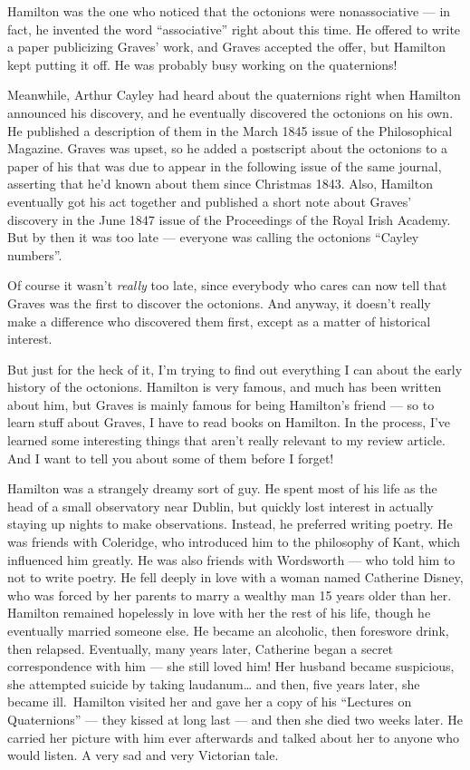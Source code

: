\documentclass{article}
\begin{document}
Hamilton was the one who noticed that the octonions were nonassociative
--- in fact, he invented the word ``associative'' right about this time.
He offered to write a paper publicizing Graves' work, and Graves
accepted the offer, but Hamilton kept putting it off. He was probably
busy working on the quaternions!

Meanwhile, Arthur Cayley had heard about the quaternions right when
Hamilton announced his discovery, and he eventually discovered the
octonions on his own. He published a description of them in the March
1845 issue of the Philosophical Magazine. Graves was upset, so he added
a postscript about the octonions to a paper of his that was due to
appear in the following issue of the same journal, asserting that he'd
known about them since Christmas 1843. Also, Hamilton eventually got his
act together and published a short note about Graves' discovery in the
June 1847 issue of the Proceedings of the Royal Irish Academy. But by
then it was too late --- everyone was calling the octonions ``Cayley
numbers''.

Of course it wasn't \emph{really} too late, since everybody who cares
can now tell that Graves was the first to discover the octonions. And
anyway, it doesn't really make a difference who discovered them first,
except as a matter of historical interest.

But just for the heck of it, I'm trying to find out everything I can
about the early history of the octonions. Hamilton is very famous, and
much has been written about him, but Graves is mainly famous for being
Hamilton's friend --- so to learn stuff about Graves, I have to read
books on Hamilton. In the process, I've learned some interesting things
that aren't really relevant to my review article. And I want to tell you
about some of them before I forget!

Hamilton was a strangely dreamy sort of guy. He spent most of his life
as the head of a small observatory near Dublin, but quickly lost
interest in actually staying up nights to make observations. Instead, he
preferred writing poetry. He was friends with Coleridge, who introduced
him to the philosophy of Kant, which influenced him greatly. He was also
friends with Wordsworth --- who told him to not to write poetry. He fell
deeply in love with a woman named Catherine Disney, who was forced by
her parents to marry a wealthy man 15 years older than her. Hamilton
remained hopelessly in love with her the rest of his life, though he
eventually married someone else. He became an alcoholic, then foreswore
drink, then relapsed. Eventually, many years later, Catherine began a
secret correspondence with him --- she still loved him! Her husband
became suspicious, she attempted suicide by taking laudanum\ldots{} and
then, five years later, she became ill.~Hamilton visited her and gave
her a copy of his ``Lectures on Quaternions'' --- they kissed at long
last --- and then she died two weeks later. He carried her picture with
him ever afterwards and talked about her to anyone who would listen. A
very sad and very Victorian tale.
\end{document}

